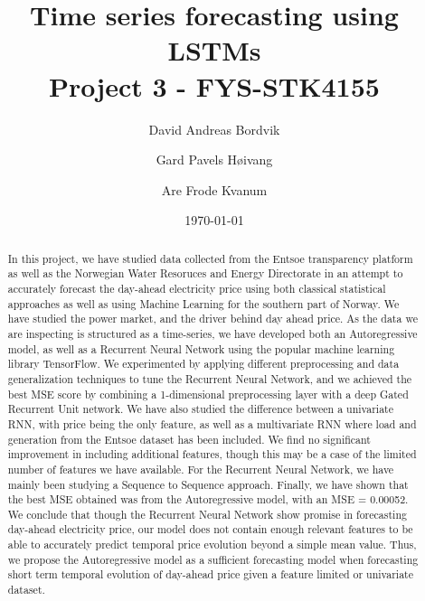 \documentclass
[twocolumn,
secnumarabic,
nobibnotes,
aps,
prl,
reprint,
groupedaddress,
amsmath,
amssymb,
]{revtex4-2}
\begin{document}

\title{Time series forecasting using LSTMs \\ Project 3 - FYS-STK4155}
\author{David Andreas Bordvik}
\author{Gard Pavels Høivang}
\author{Are Frode Kvanum}

\date{\today}

\begin{abstract}
  In this project, we have studied data collected from the Entsoe transparency platform as well as the Norwegian Water Resoruces and Energy Directorate in an attempt to accurately forecast the day-ahead electricity price using both classical statistical approaches as well as using Machine Learning for the southern part of Norway. We have studied the power market, and the driver behind day ahead price. As the data we are inspecting is structured as a time-series, we have developed both an Autoregressive model, as well as a Recurrent Neural Network using the popular machine learning library TensorFlow. We experimented by applying different preprocessing and data generalization techniques to tune the Recurrent Neural Network, and we achieved the best MSE score by combining a 1-dimensional preprocessing layer with a deep Gated Recurrent Unit network. We have also studied the difference between a univariate RNN, with price being the only feature, as well as a multivariate RNN where load and generation from the Entsoe dataset has been included. We find no significant improvement in including additional features, though this may be a case of the limited number of features we have available. For the Recurrent Neural Network, we have mainly been studying a Sequence to Sequence approach. Finally, we have shown that the best MSE obtained was from the Autoregressive model, with an MSE = 0.00052. We conclude that though the Recurrent Neural Network show promise in forecasting day-ahead electricity price, our model does not contain enough relevant features to be able to accurately predict temporal price evolution beyond a simple mean value. Thus, we propose the Autoregressive model as a sufficient forecasting model when forecasting short term temporal evolution of day-ahead price given a feature limited or univariate dataset.
\end{abstract}

\maketitle
\end{document}
